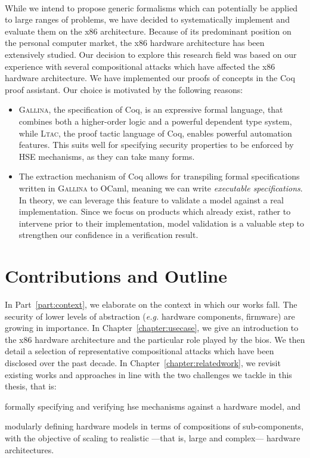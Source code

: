 \paragraph{}
%
While we intend to propose generic formalisms which can potentially be applied
to large ranges of problems, we have decided to systematically implement and
evaluate them on the x86 architecture.
%
Because of its predominant position on the personal computer market, the x86
hardware architecture has been extensively studied.
%
Our decision to explore this research field was based on our experience with
several compositional attacks which have affected the x86 hardware architecture.
%
We have implemented our proofs of concepts in the Coq proof assistant.
%
Our choice is motivated by the following reasons:
%
\begin{itemize}
\item {\scshape Gallina}, the specification of Coq, is an expressive formal
  language, that combines both a higher-order logic and a powerful dependent
  type system, while {\scshape Ltac}, the proof tactic language of Coq, enables
  powerful automation features.
  This suits well for specifying security properties to be enforced by HSE
  mechanisms, as they can take many forms.
\item The extraction mechanism of Coq allows for transpiling formal
  specifications written in {\scshape Gallina} to OCaml, meaning we can write
  \emph{executable specifications}.
  In theory, we can leverage this feature to validate a model against a real
  implementation.
  Since we focus on products which already exist, rather to intervene prior to
  their implementation, model validation is a valuable step to strengthen our
  confidence in a verification result.
\end{itemize}

\section{Contributions and Outline}

In Part~\ref{part:context}, we elaborate on the context in which our works fall.
%
The security of lower levels of abstraction (\emph{e.g.} hardware components,
firmware) are growing in importance.
%
In Chapter~\ref{chapter:usecase}, we give an introduction to the x86 hardware
architecture and the particular role played by the \ac{bios}.
%
We then detail a selection of representative compositional attacks which have
been disclosed over the past decade.
%
%
In Chapter~\ref{chapter:relatedwork}, we revisit existing works and approaches
in line with the two challenges we tackle in this thesis, that is:
%
\begin{inparaenum}[(1)]
\item formally specifying and verifying \ac{hse} mechanisms against a hardware
  model, and
%
\item modularly defining hardware models in terms of compositions of
  sub-components, with the objective of scaling to realistic ---that is, large
  and complex--- hardware architectures.
\end{inparaenum}

